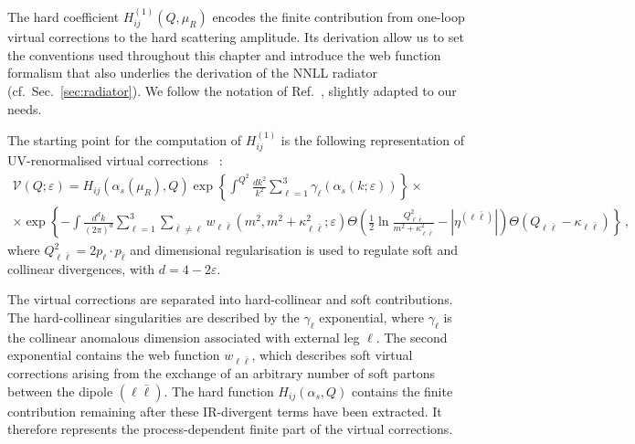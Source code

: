 The hard coefficient $H_{ij}^{(1)}(Q,\mu_R)$ encodes the finite contribution
from one-loop virtual corrections to the hard scattering amplitude.
Its derivation allow us to set the conventions used throughout this chapter and introduce
the web function formalism that also underlies the derivation of the NNLL radiator
(cf.\ Sec.~\ref{sec:radiator}). We follow the notation of Ref.~\cite{Catani:1998bh},
 slightly adapted to our needs.
 
 The starting point for the computation of $H_{ij}^{(1)}$ is the
following representation of UV-renormalised virtual corrections
~\cite{Banfi:2018mcq,Arpino:2019ozn}:
\begin{multline}
  \label{eq:HQ}
  \mathcal{V}(Q;\varepsilon) = H_{ij}(\alpha_s(\mu_R),Q) \exp\left\{\int^{Q^2}\!\!\frac{dk^2}{k^2}\sum_{\ell=1}^3 \gamma_\ell\left(\alpha_s(k;\varepsilon)\right)\right\}\times \\ \times \exp\left\{-\int \frac{d^dk}{(2\pi)^d}\sum_{\ell=1}^3 \sum_{\bar \ell\ne \ell} w_{\ell \bar \ell}(m^2,m^2+\kappa_{\ell\bar \ell}^2;\varepsilon) \Theta\left(\frac 12\ln\frac{Q^2_{\ell\bar \ell}}{m^2+\kappa_{\ell\bar \ell}^2}-|\eta^{(\ell\bar \ell)}| \right) \Theta(Q_{\ell \bar \ell}-\kappa_{\ell\bar \ell})\right\}\,,
\end{multline}
where $Q_{\ell\bar\ell}^2=2p_\ell\cdot p_{\bar\ell}$ and dimensional
regularisation is used to regulate soft and collinear divergences,
with $d=4-2\varepsilon$.  

The virtual corrections are separated into hard-collinear and soft
contributions. The hard-collinear singularities are described by the
$\gamma_\ell$ exponential, where $\gamma_\ell$ is the collinear anomalous
dimension associated with external leg $\ell$. The second exponential
contains the web function $w_{\ell\bar\ell}$, which describes soft
virtual corrections arising from the exchange of an arbitrary number of soft partons between
the dipole $(\ell\bar\ell)$. 
The hard function $H_{ij}(\alpha_s,Q)$ contains the finite contribution
remaining after these IR-divergent terms have been extracted. It
therefore represents the process-dependent finite part of the virtual
corrections.

